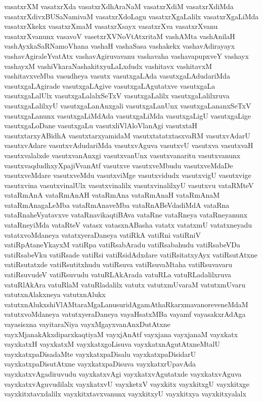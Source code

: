 {vasatxrXM
vasatxrXda
vasatxrXdhAraNaM
vasatxrXdiM
vasatxrXdiMda
vasatxrXdivxBUSaNamivaM
vasatxrXdoLagu
vasatxrXgaLalilx
vasatxrXgaLiMda
vasatxrXkekx
vasatxrXmaM
vasatxrXsayx
vasatxrXva
vasatxrXvanu
vasatxrXvanunx
vasavoV
vasetxrXVNoVtAtxritaM
vashAMta
vashAnilaH
vashAyxkaSaRNamoVhana
vashaH
vashaSasa
vashakekx
vashavAdirayayx
vashavAgiraleYvatAtx
vashavAgiruvavanu
vashavaha
vashavapupxveY
vashayx
vashayxM
vashiVkaraNashakitxyuLaLxdudx
vashitavx
vashitavxM
vashitavxveMba
vasudheya
vasutx
vasutxgaLAda
vasutxgaLAdudariMda
vasutxgaLAgirade
vasutxgaLAgive
vasutxgaLAgutatxve
vasutxgaLa
vasutxgaLalUlx
vasutxgaLalalxSeTxV
vasutxgaLalilx
vasutxgaLalilxruva
vasutxgaLalilxyU
vasutxgaLanAnxgali
vasutxgaLanUnx
vasutxgaLananxSeTxV
vasutxgaLanunx
vasutxgaLiMdAda
vasutxgaLiMda
vasutxgaLigU
vasutxgaLige
vasutxgaLoDane
vasutxgaLu
vasutxliVlAloVlanAgi
vasutxtaH
vasutxtarxyABidhA
vasutxtarxyamidaM
vasutxtatatxtasxvaRM
vasutxvAdarU
vasutxvAdare
vasutxvAdudariMda
vasutxvAguva
vasutxvU
vasutxva
vasutxvaH
vasutxvalalxde
vasutxvanAnxgi
vasutxvanUnx
vasutxvanaritu
vasutxvanunx
vasutxvaqdudhxyXpajiVvanAtf
vasutxve
vasutxveMbudu
vasutxveMdaDe
vasutxveMdare
vasutxveMdu
vasutxviMge
vasutxvidudx
vasutxvigU
vasutxvige
vasutxvina
vasutxvinalUlx
vasutxvinalilx
vasutxvinalilxyU
vasutxvu
vataRMteV
vataRmAnA
vataRmAnAH
vataRmAna
vataRmAnaH
vataRmAnaM
vataRmAnagaLeMba
vataRmAnaveMba
vataRnABeVdadiMdA
vataRna
vataRnaheVyatavxve
vataRnavikaqtiBAva
vataRne
vataRneya
vataRneyanunx
vataRneyiMda
vataRteV
vatasx
vatasxnABasha
vatatx
vatatxmU
vatatxneyadu
vatatxvoMdaneya
vatatxyeraDaneya
vatiRkA
vatiRni
vatiRniV
vatiRpAtaneYkayxM
vatiRpa
vatiRsabAradu
vatiRsabahudu
vatiRsabeVDa
vatiRsabeVku
vatiRsade
vatiRsi
vatiRsidAdxdare
vatiRsitatxyAyx
vatiRsutAtxne
vatiRsutatxde
vatiRsutitxhudu
vatiRsuva
vatiRsuvaMtaha
vatiRsuvavaru
vatiRsuvudeV
vatiRsuvudu
vatuRLAkArada
vatuRLa
vatuRLadalilxruva
vatuRlAkAra
vatuRlaM
vatuRladalilx
vatutx
vatutxmUvaraM
vatutxmUvaru
vatutxnAlakxneya
vatutxnAlukx
vatutxnAlukxshiVlAMtaraMgaLanusuridAgamAthaRkarxmavanoreveneMdaM
vatutxvoMdaneya
vatutxyeraDaneya
vayaHsatxMBa
vayamf
vayasakxrAdAga
vayasisxna
vayitaraNiya
vayxMgayxvanAnxDutAtxne
vayxMjanakAkxdiparxkaqtiyaM
vayxjAnAtf
vayxjana
vayxjanaM
vayxkatx
vayxkatxH
vayxkatxM
vayxkatxgoLisuva
vayxkatxnAgutAtxneMtalU
vayxkatxpaDisadaMte
vayxkatxpaDisalu
vayxkatxpaDisidarU
vayxkatxpaDisutAtxne
vayxkatxpaDisuva
vayxkatxrUpavAda
vayxkatxvAgadiruvudu
vayxkatxvAgi
vayxkatxvAgutatxde
vayxkatxvAguva
vayxkatxvAguvudilalx
vayxkatxvU
vayxketxV
vayxkitx
vayxkitxgU
vayxkitxge
vayxkitxtavxdalilx
vayxkitxtavxvanunx
vayxkitxyU
vayxkitxya
vayxkitxyalalx
}
